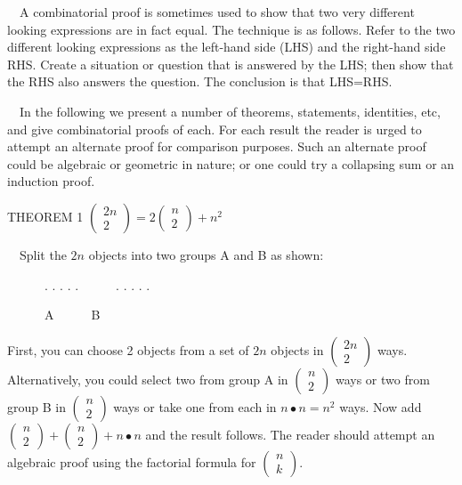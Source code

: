 \documentclass{article}
\begin{document}
\ \ A combinatorial proof is sometimes used to show that two very different looking expressions are in fact equal.  The
technique is as follows.  Refer to the two different looking expressions as the left-hand side (LHS) and the right-hand
side RHS.  Create a situation or question that is answered by the LHS; then show that the RHS also answers the
question.  The conclusion is that LHS=RHS.

\ \ In the following we present a number of theorems, statements, identities, etc, and give combinatorial proofs of
each.  For each result the reader is urged to attempt an alternate proof for comparison purposes.  Such an alternate
proof could be algebraic or geometric in nature; or one could try a collapsing sum or an induction proof.

THEOREM 1   $\left(\begin{matrix}2n\\2\end{matrix}\right)=2\left(\begin{matrix}n\\2\end{matrix}\right)+n^2$

\ \ Split the  $2n$ objects into two groups  A  and  B  as shown:

\ \ \ \ \ \ . . . . .\ \ \ \ \ \   . . . . . 

\ \ \ \ \ \    A\ \ \ \ \ \   B

First, you can choose 2 objects from a set of  $2n$ objects in $\left(\begin{matrix}2n\\2\end{matrix}\right)$ ways. 
Alternatively, you could select two from group  A  in $\left(\begin{matrix}n\\2\end{matrix}\right)$ ways or two from
group  B  in $\left(\begin{matrix}n\\2\end{matrix}\right)$ ways or take one from each in   $n{\bullet}n=n^2$ ways.  Now
add $\left(\begin{matrix}n\\2\end{matrix}\right)+\left(\begin{matrix}n\\2\end{matrix}\right)+n{\bullet}n$ and the
result follows.  The reader should attempt an algebraic proof using the factorial formula for
$\left(\begin{matrix}n\\k\end{matrix}\right)$.
\end{document}
